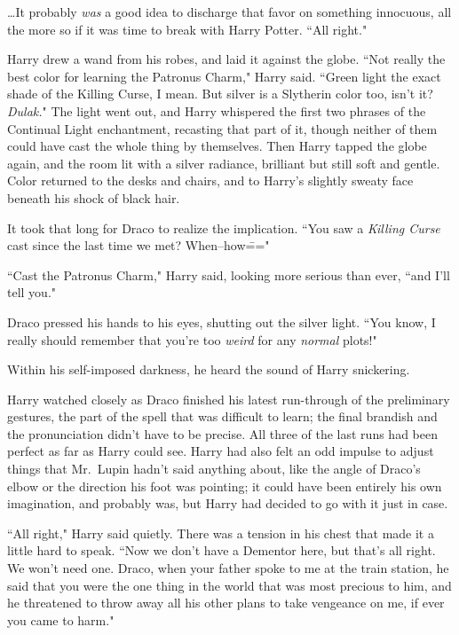 {\ldots}It probably \emph{was} a good idea to discharge that favor on something innocuous, all the more so if it was time to break with Harry Potter. ``All right."

Harry drew a wand from his robes, and laid it against the globe. ``Not really the best color for learning the Patronus Charm," Harry said. ``Green light the exact shade of the Killing Curse, I mean. But silver is a Slytherin color too, isn't it? \emph{Dulak.}" The light went out, and Harry whispered the first two phrases of the Continual Light enchantment, recasting that part of it, though neither of them could have cast the whole thing by themselves. Then Harry tapped the globe again, and the room lit with a silver radiance, brilliant but still soft and gentle. Color returned to the desks and chairs, and to Harry's slightly sweaty face beneath his shock of black hair.

It took that long for Draco to realize the implication. ``You saw a \emph{Killing Curse} cast since the last time we met? When\---how\==="

``Cast the Patronus Charm," Harry said, looking more serious than ever, ``and I'll tell you."

Draco pressed his hands to his eyes, shutting out the silver light. ``You know, I really should remember that you're too \emph{weird} for any \emph{normal} plots!"

Within his self-imposed darkness, he heard the sound of Harry snickering.

\later

Harry watched closely as Draco finished his latest run-through of the preliminary gestures, the part of the spell that was difficult to learn; the final brandish and the pronunciation didn't have to be precise. All three of the last runs had been perfect as far as Harry could see. Harry had also felt an odd impulse to adjust things that Mr.~Lupin hadn't said anything about, like the angle of Draco's elbow or the direction his foot was pointing; it could have been entirely his own imagination, and probably was, but Harry had decided to go with it just in case.

``All right," Harry said quietly. There was a tension in his chest that made it a little hard to speak. ``Now we don't have a Dementor here, but that's all right. We won't need one. Draco, when your father spoke to me at the train station, he said that you were the one thing in the world that was most precious to him, and he threatened to throw away all his other plans to take vengeance on me, if ever you came to harm."

